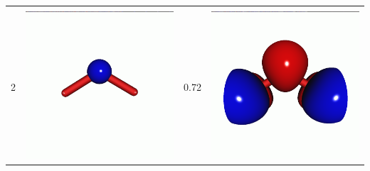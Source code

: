 \documentclass[journal=jctcce,manuscript=article]{achemso}
\begin{document}
\begin{table}[H]
\begin{tabular}{ c | c c c }
\begin{minipage}{0.2\textwidth}
    \end{minipage}
    \\
        2 &  
    \begin{minipage}{0.2\textwidth}
        \centering
        \includegraphics[scale=0.10]{NTO/O3/2h.png}
    \end{minipage}
    &
    0.72 
    &  \begin{minipage}{0.2\textwidth}
        \centering
        \includegraphics[scale=0.10]{NTO/O3/2p.png}

\end{minipage}
\end{tabular}
\end{table}
\end{document}
